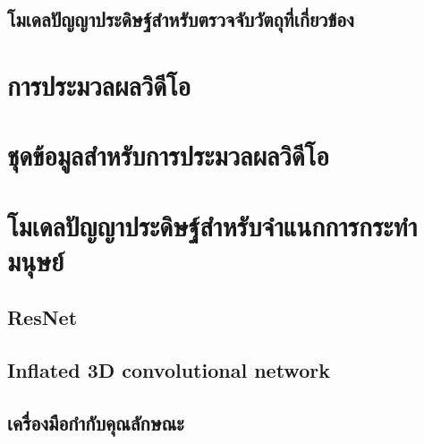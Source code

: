 \subsection{โมเดลปัญญาประดิษฐ์สำหรับตรวจจับวัตถุที่เกี่ยวข้อง}


\section{การประมวลผลวิดีโอ}

\clearpage

\section{ชุดข้อมูลสำหรับการประมวลผลวิดีโอ}

\clearpage

\section{โมเดลปัญญาประดิษฐ์สำหรับจำแนกการกระทำมนุษย์}
\subsection{ResNet}

\clearpage
\subsection{Inflated 3D convolutional network}

\clearpage

\subsection{เครื่องมือกำกับคุณลักษณะ}

